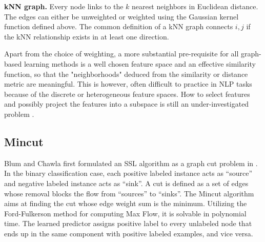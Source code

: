 \textbf{kNN graph.} Every node links to the $k$ nearest neighbors in Euclidean
distance. The edges can either be unweighted 
or weighted using the Gaussian kernel function defined above. 
The common definition of a kNN graph connects
$i, j$ if the kNN relationship exists in at least one direction.






Apart from the choice of weighting, a more substantial pre-requisite for all
graph-based learning methods is a well chosen feature space and an effective
similarity function, so that the "neighborhoods" deduced from the similarity
or distance metric are meaningful.  
This is however, often difficult to practice in NLP tasks because of the
discrete or heterogeneous feature spaces.
How to select features and possibly project the features
into a subspace is still an under-investigated problem \cite{alex}.


\subsection{Mincut}\label{sec:mincut}

Blum and Chawla first formulated an SSL algorithm as a graph cut problem in
\cite{blum}. In the binary classification case, each positive labeled instance
acts as ``source'' and negative labeled instance acts as ``sink''.
A cut is defined as a set of edges whose removal
blocks the flow from ``sources'' to ``sinks''.
The Mincut algorithm aims at finding the cut whose
edge weight sum is the minimum.
Utilizing the Ford-Fulkerson method for computing Max Flow, it is solvable in polynomial time. 
The learned predictor assigns
positive label to every unlabeled node that ends up in the same component with
positive labeled examples, and vice versa. 

